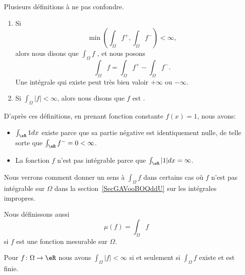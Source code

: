 \begin{normaltext}		\label{NORMooRDHAooKRniYt}
	Plusieurs définitions à ne pas confondre.
	\begin{enumerate}
		\item
		      Si
		      \begin{equation}		\label{EQooCUTSooBRpBvt}
			      \min\left( \int_{\Omega}f^+,\int_{\Omega}f^-\right)<\infty,
		      \end{equation}
		      alors nous disons que \( \int_{\Omega}f\) , et nous posons
		      \begin{equation}	\label{EQooOGFDooUSfCDg}
			      \int_{\Omega}f=\int_{\Omega}f^+-\int_{\Omega}f^-.
		      \end{equation}
		      Une intégrale qui existe peut très bien valoir \( +\infty\) ou \( -\infty\).
		\item
		      Si \( \int_{\Omega}| f |<\infty\), alors nous disons que \( f\) est .
	\end{enumerate}
	D'après ces définitions, en prenant fonction constante \( f(x)=1\), nous avons:
	\begin{itemize}
		\item \( \int_{\eR}1dx\) existe parce que sa partie négative est identiquement nulle, de telle sorte que \( \int_{\eR}f^-=0<\infty\).
		\item La fonction \( f\) n'est pas intégrable parce que \( \int_{\eR}| 1 |dx=\infty\).
	\end{itemize}
\end{normaltext}

Nous verrons comment donner un sens à \( \int_{\Omega}f\) dans certains cas où \( f\) n'est pas intégrable sur \( \Omega\) dans la section~\ref{SecGAVooBOQddU} sur les intégrales impropres.

Nous définissons aussi
\begin{equation}
	\mu(f)=\int_{\Omega}f
\end{equation}
si \( f\) est une fonction mesurable sur \( \Omega\).

\begin{lemma}       \label{LEMooMWKTooIKomSw}
	Pour \( f\colon \Omega\to \eR\) nous avons \( \int_{\Omega}| f |<\infty\) si et seulement si \( \int_{\Omega}f\) existe et est finie.
\end{lemma}

